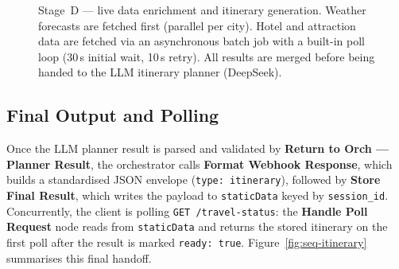 \documentclass[12pt,a4paper]{report}
\begin{document}
\begin{figure}[H]
{
}%
\caption{Stage~D --- live data enrichment and itinerary generation. Weather forecasts are fetched
         first (parallel per city). Hotel and attraction data are fetched via an asynchronous batch
         job with a built-in poll loop (30\,s initial wait, 10\,s retry). All results are merged
         before being handed to the LLM itinerary planner (DeepSeek).}
\label{fig:seq-poi}
\end{figure}
 
\subsection{Final Output and Polling}
 
Once the LLM planner result is parsed and validated by \textbf{Return to Orch --- Planner Result},
the orchestrator calls \textbf{Format Webhook Response}, which builds a standardised JSON envelope
(\texttt{type: itinerary}), followed by \textbf{Store Final Result}, which writes the payload to
\texttt{staticData} keyed by \texttt{session\_id}. Concurrently, the client is polling
\texttt{GET /travel-status}: the \textbf{Handle Poll Request} node reads from \texttt{staticData}
and returns the stored itinerary on the first poll after the result is marked \texttt{ready: true}.
Figure~\ref{fig:seq-itinerary} summarises this final handoff.
 
\end{document}
